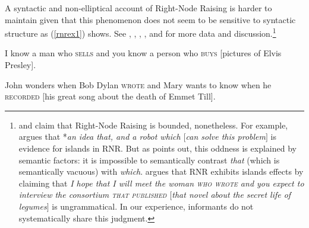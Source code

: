 \documentclass[output=paper
                ,modfonts
                ,nonflat
	        ,collection
	        ,collectionchapter
	        ,collectiontoclongg
 	        ,biblatex
                ,babelshorthands
                ,newtxmath
                ,draftmode
                ,colorlinks, citecolor=brown
]{./langsci/langscibook}
\begin{document}
{
\begin{exe}
 \ex 
 \begin{xlista}
\end{xlista}
\end{exe}


A syntactic and non-elliptical account of Right-Node Raising is harder to maintain given that this phenomenon does not seem to be sensitive to  syntactic structure as (\ref{rnrex1}) shows. See 
\citet{bresnan74}, \citet[299]{wexlercull},  \citet[45]{grosu81}, \citet{mccawley}, and \citet[382, footnote 30]{sab}
for more data and discussion.\footnote{\citet{steedman85,gapsteed,steedmanbook}
and \citet[183]{dowty88} claim that
Right-Node Raising is bounded, nonetheless.
For example, \citet{
dowty88} argues that  *\emph{an idea that, and a robot which $[$can solve this problem$]$} is  evidence for islands in RNR. But as \citet[95]{phil}
 points out, this oddness is explained by semantic factors: it is impossible to   semantically contrast \emph{that} (which is semantically vacuous) with \emph{which}.
 \citet[17]{steedmanbook}   argues that RNR
exhibits islands effects by claiming that \emph{I hope that I will meet the woman
\textsc{who wrote} and you expect to interview the
consortium \textsc{that published} $[$that
novel about the secret life of legumes$]$} is ungrammatical.
In our experience, informants do not systematically share this judgment.}


\begin{exe}
\ex
\begin{xlista}
\ex  I know a man who \textsc{sells} and you know a person who \textsc{buys}
                     [pictures of Elvis Presley].

\ex John wonders when Bob Dylan
\textsc{wrote} and Mary wants to know when
  he
\textsc{recorded} [his great song about the death of Emmet Till].
 

\end{xlista}
\end{exe}}
\end{document}
